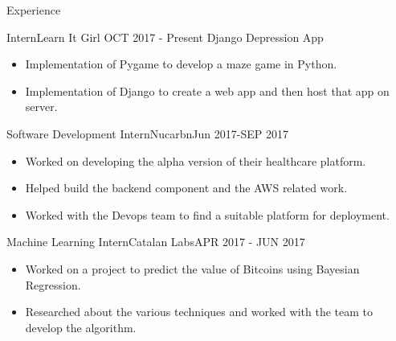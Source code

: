 \documentclass[]{mcdowellcv}
\begin{document}
	\makeheader
	
	\begin{cvsection}{Experience}
		\begin{cvsubsection}{ Intern}{Learn It Girl }{OCT 2017 - Present}
			Django Depression App		
			\begin{itemize}
				\item Implementation of Pygame to develop a maze game in Python.
				\item Implementation of Django to create a web app  and then host that app on server.
			\end{itemize}
		\end{cvsubsection}
		
		\begin{cvsubsection}{Software Development Intern}{Nucarbn}{Jun 2017-SEP 2017}	
			\begin{itemize}
				\item Worked on developing the alpha version of their healthcare platform.
				\item Helped build the backend component and the AWS related work.
				\item Worked with the Devops team to find a suitable platform for deployment.
			\end{itemize}
		\end{cvsubsection}
		
		\begin{cvsubsection}{Machine Learning Intern}{Catalan Labs}{APR 2017 - JUN 2017}		
			\begin{itemize}
				\item Worked on a project to predict the value of Bitcoins using Bayesian Regression.
				\item Researched about the various techniques and worked with the team to develop the algorithm.
			\end{itemize}
		\end{cvsubsection}
		

\end{cvsection}
\end{document}

